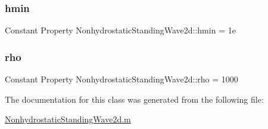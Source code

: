 \subsubsection{\texorpdfstring{hmin}{hmin}}
{\footnotesize\ttfamily Constant Property Nonhydrostatic\+Standing\+Wave2d\+::hmin = 1e}

\mbox{\label{class_nonhydrostatic_standing_wave2d_ae75f242ff807621baf2d8cd26680af10}} 
\subsubsection{\texorpdfstring{rho}{rho}}
{\footnotesize\ttfamily Constant Property Nonhydrostatic\+Standing\+Wave2d\+::rho = 1000}



The documentation for this class was generated from the following file\+:\begin{DoxyCompactItemize}
\item 
\hyperlink{_nonhydrostatic_standing_wave2d_8m}{Nonhydrostatic\+Standing\+Wave2d.\+m}\end{DoxyCompactItemize}
